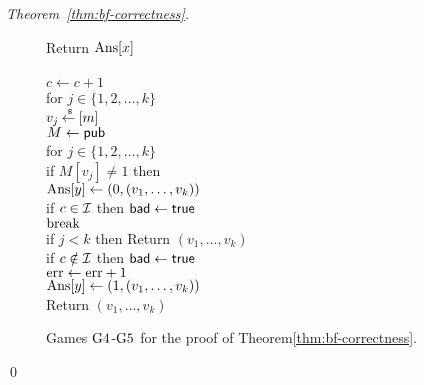 \begin{proof}[Theorem~\ref{thm:bf-correctness}]
\begin{figure}[tp]
{{Return $\mathrm{Ans}[x]$\\
%
}
{
\\
$c \gets c + 1$\\
for $j \in \{1,2,\ldots,k\}$\\
\nudge $v_j {\:\stackrel{{\scriptscriptstyle \hspace{0.2em}\$}} {\leftarrow}\:} [m]$\\
%
$M \gets{\sf pub}$\\
for $j \in \{1,2,\ldots,k\}$\\
\nudge if $M[v_j] \neq 1$ then \\
\nudge \nudge $\mathrm{Ans}[y] \gets (0, (v_1, \ldots, v_{k}) )$\\
\nudge \nudge if $c \in {\cal I}$ then $\mathsf{bad} \gets \mathsf{true}$\\
\nudge \nudge $\mathrm{break}$\\
if $j < k$ then Return $\left(v_1,\ldots,v_k\right)$\\
if $c \notin {\cal I}$ then $\mathsf{bad} \gets \mathsf{true}$\\
$\mathrm{err} \gets \mathrm{err} +1$\\
$\mathrm{Ans}[y] \gets (1, (v_1, \ldots, v_{k}))$\\
Return $\left(v_1,\ldots,v_k\right)$
}
}
\caption{Games $\text{G4}$-$\text{G5}$ for the
proof of Theorem\ref{thm:bf-correctness}.}
\label{fig:bf-correctness-games2}
\end{figure}
\hfill\qed
\end{proof}
